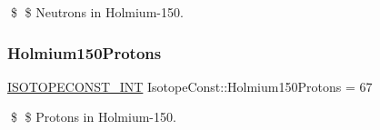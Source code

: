 \$ \$ Neutrons in Holmium-\/150. \mbox{\label{group___isotope_const-_holmium-_ho150_ga1f04fd5ec01c631ecce7725c67dc5ed1}} 
\subsubsection{\texorpdfstring{Holmium150\+Protons}{Holmium150Protons}}
{\footnotesize\ttfamily \mbox{\hyperlink{group___isotope_const-_macros_ga5f18360b3e99483a35c32d789e62621c}{I\+S\+O\+T\+O\+P\+E\+C\+O\+N\+S\+T\+\_\+\+I\+NT}} Isotope\+Const\+::\+Holmium150\+Protons = 67}

\$ \$ Protons in Holmium-\/150. 